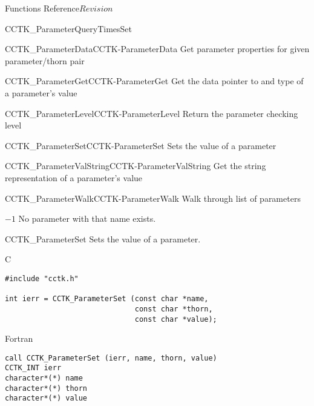 \begin{cactuspart}{ Functions Reference}{}{$Revision$}
\begin{FunctionDescription}{CCTK\_ParameterQueryTimesSet}
\begin{SeeAlsoSection}
\begin{SeeAlso2}{CCTK\_ParameterData}{CCTK-ParameterData}
  Get parameter properties for given parameter/thorn pair
\end{SeeAlso2}
\begin{SeeAlso2}{CCTK\_ParameterGet}{CCTK-ParameterGet}
  Get the data pointer to and type of a parameter's value
\end{SeeAlso2}
\begin{SeeAlso2}{CCTK\_ParameterLevel}{CCTK-ParameterLevel}
  Return the parameter checking level
\end{SeeAlso2}
\begin{SeeAlso2}{CCTK\_ParameterSet}{CCTK-ParameterSet}
  Sets the value of a parameter
\end{SeeAlso2}
\begin{SeeAlso2}{CCTK\_ParameterValString}{CCTK-ParameterValString}
  Get the string representation of a parameter's value
\end{SeeAlso2}
\begin{SeeAlso2}{CCTK\_ParameterWalk}{CCTK-ParameterWalk}
  Walk through list of parameters
\end{SeeAlso2}
\end{SeeAlsoSection}

\begin{ErrorSection}
\begin{Error}{$-1$}
No parameter with that name exists.
\end{Error}
\end{ErrorSection}
\end{FunctionDescription}


\begin{FunctionDescription}{CCTK\_ParameterSet}
\label{CCTK-ParameterSet}
Sets the value of a parameter.

\begin{SynopsisSection}
\begin{Synopsis}{C}
\begin{verbatim}
#include "cctk.h"

int ierr = CCTK_ParameterSet (const char *name,
                              const char *thorn,
                              const char *value);
\end{verbatim}
\end{Synopsis}

\begin{Synopsis}{Fortran}
\begin{verbatim}
call CCTK_ParameterSet (ierr, name, thorn, value)
CCTK_INT ierr
character*(*) name
character*(*) thorn
character*(*) value
\end{verbatim}
\end{Synopsis}
\end{SynopsisSection}


\end{FunctionDescription}
\end{cactuspart}
